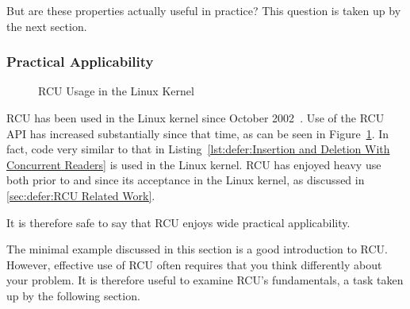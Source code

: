 But are these properties actually useful in practice?
This question is taken up by the next section.

\subsubsection{Practical Applicability}
\label{sec:defer:Practical Applicability}

\begin{figure}
\centering
{}
\caption{RCU Usage in the Linux Kernel}
\label{fig:defer:RCU Usage in the Linux Kernel}
\end{figure}

RCU has been used in the Linux kernel since
October 2002~\cite{Torvalds2.5.43}.
Use of the RCU API has increased substantially since that time,
as can be seen in
Figure~\ref{fig:defer:RCU Usage in the Linux Kernel}.
In fact, code very similar to that in
Listing~\ref{lst:defer:Insertion and Deletion With Concurrent Readers}
is used in the Linux kernel.
RCU has enjoyed heavy use both prior to and since its acceptance
in the Linux kernel, as discussed in
\cref{sec:defer:RCU Related Work}.

It is therefore safe to say that RCU enjoys wide practical applicability.

The minimal example discussed in this section is a good introduction to RCU\@.
However, effective use of RCU often requires that you think differently
about your problem.
It is therefore useful to examine RCU's fundamentals, a task taken up
by the following section.
